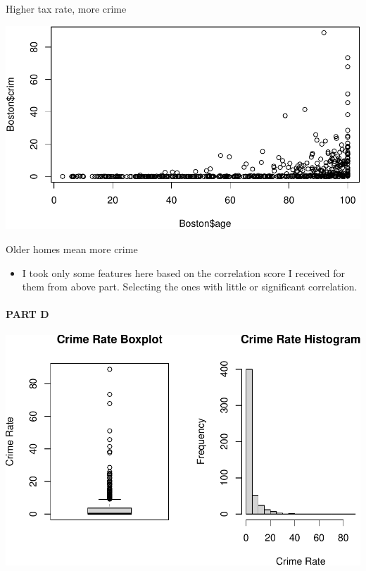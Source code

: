 \documentclass[
]{article}
\providecommand{\tightlist}{%
  \setlength{\itemsep}{0pt}\setlength{\parskip}{0pt}}
\begin{document}
Higher tax rate, more crime

\begin{center}\includegraphics{Disha_Gandhi_Take_Home_Exam_PDF_files/figure-latex/unnamed-chunk-7-1} \end{center}

Older homes mean more crime

\begin{itemize}
\tightlist
\item
  I took only some features here based on the correlation score I
  received for them from above part. Selecting the ones with little or
  significant correlation.
\end{itemize}

\pagebreak

\hypertarget{part-d}{%
\paragraph{PART D}\label{part-d}}

\begin{center}\includegraphics{Disha_Gandhi_Take_Home_Exam_PDF_files/figure-latex/unnamed-chunk-8-1} \end{center}
\end{document}
